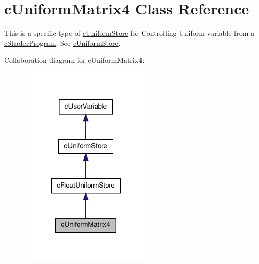 \hypertarget{classc_uniform_matrix4}{
\section{cUniformMatrix4 Class Reference}
\label{classc_uniform_matrix4}
}


This is a specific type of \hyperlink{classc_uniform_store}{cUniformStore} for Controlling Uniform variable from a \hyperlink{classc_shader_program}{cShaderProgram}. See \hyperlink{classc_uniform_store}{cUniformStore}.  




Collaboration diagram for cUniformMatrix4:\nopagebreak
\begin{figure}[H]
\begin{center}
\leavevmode
\includegraphics[width=180pt]{classc_uniform_matrix4__coll__graph}
\end{center}
\end{figure}
